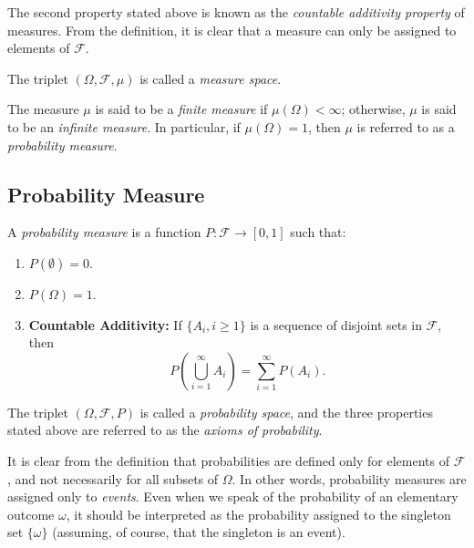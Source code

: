 The second property stated above is known as the \textit{countable additivity property} of measures. From the definition, it is clear that a measure can only be assigned to elements of \(\mathcal{F}\).

\begin{definition}
    The triplet \((\Omega, \mathcal{F}, \mu)\) is called a \textit{measure space}. 
\end{definition}

The measure \(\mu\) is said to be a \textit{finite measure} if \(\mu(\Omega) < \infty\); otherwise, \(\mu\) is said to be an \textit{infinite measure}. In particular, if \(\mu(\Omega) = 1\), then \(\mu\) is referred to as a \textit{probability measure}.


\subsection{Probability Measure}

\begin{definition}
    A \textit{probability measure} is a function \( P: \mathcal{F} \to [0, 1] \) such that:

\begin{enumerate}
    \item \( P(\emptyset) = 0 \).
    \item \( P(\Omega) = 1 \).
    \item \textbf{Countable Additivity:} If \( \{A_i, i \geq 1\} \) is a sequence of disjoint sets in \( \mathcal{F} \), then
    \[
    P\left(\bigcup_{i=1}^{\infty} A_i\right) = \sum_{i=1}^{\infty} P(A_i).
    \]
\end{enumerate}
\end{definition}

\begin{definition}
    The triplet \( (\Omega, \mathcal{F}, P) \) is called a \textit{probability space}, and the three properties stated above are referred to as the \textit{axioms of probability}.
\end{definition}

It is clear from the definition that probabilities are defined only for elements of \( \mathcal{F} \), and not necessarily for all subsets of \( \Omega \). In other words, probability measures are assigned only to \textit{events}. Even when we speak of the probability of an elementary outcome \( \omega \), it should be interpreted as the probability assigned to the singleton set \( \{\omega\} \) (assuming, of course, that the singleton is an event).

